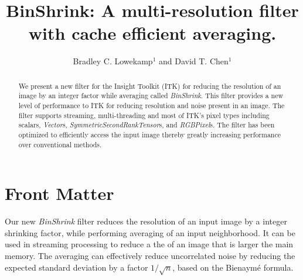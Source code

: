 \documentclass{InsightArticle}
\title{BinShrink: A multi-resolution filter with cache efficient averaging. }
\author{Bradley C. Lowekamp$^{1}$ and David T. Chen$^{1}$}
\newcommand{\IJhandlerIDnumber}{0}
\begin{document}
%
%
\IJhandlefooter{\IJhandlerIDnumber}


\ifpdf
\else
\fi


\maketitle


\ifhtml
\chapter*{Front Matter\label{front}}
\fi

\begin{abstract}
\noindent
We present a new filter for the Insight Toolkit (ITK) for reducing the
resolution of an image by an integer factor while averaging called
\textit{BinShrink}. This filter provides a new level of performance to
ITK for reducing resolution and noise present in an image. The filter
supports streaming, multi-threading and most of ITK's pixel types
including scalars, \textit{Vector}s,
\textit{SymmetricSecondRankTensor}s, and \textit{RGBPixel}s. The
filter has been optimized to efficiently access the input image thereby
greatly increasing performance over conventional methods.

\end{abstract}

\IJhandlenote{\IJhandlerIDnumber}

\tableofcontents

Our new \textit{BinShrink} filter reduces the resolution of an input
image by a integer shrinking factor, while performing averaging of an
input neighborhood. It can be used in streaming processing to reduce a
the of an image that is larger the main memory. The averaging can
effectively reduce uncorrelated noise by reducing the expected
standard deviation by a factor $1/\sqrt{n}$, based on the Bienaymé
formula.
\end{document}
